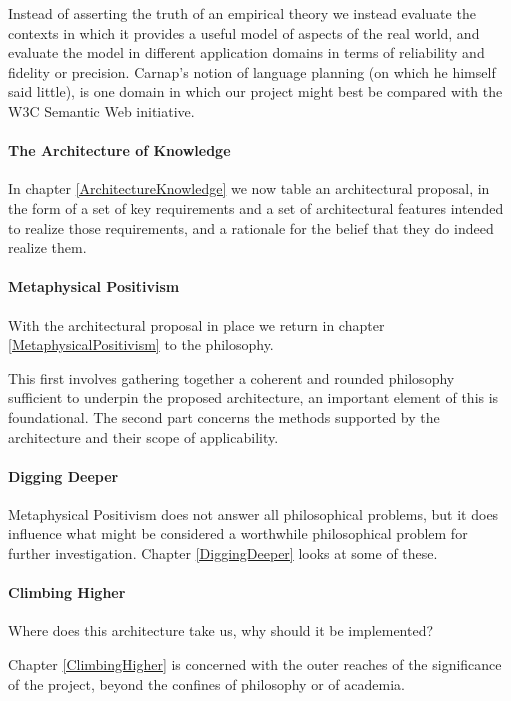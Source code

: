 Instead of asserting the truth of an empirical theory we instead
evaluate the contexts in which it provides a useful model of aspects
of the real world, and evaluate the model in different application
domains in terms of reliability and fidelity or precision.
Carnap's notion of language planning (on which he himself said
little), is one domain in which our project might best be compared
with the W3C Semantic Web initiative.

\paragraph{The Architecture of Knowledge}

In chapter \ref{ArchitectureKnowledge} we now table an architectural
  proposal, in the form of a set of key requirements and a set of
  architectural features intended to realize those requirements, and a
  rationale for the belief that they do indeed realize them.

\paragraph{Metaphysical Positivism}

With the architectural proposal in place we return in chapter
\ref{MetaphysicalPositivism} to the philosophy.

This first involves gathering together a coherent and rounded
philosophy sufficient to underpin the proposed architecture, an
important element of this is foundational.
The second part concerns the methods supported by the architecture and
their scope of applicability.

\paragraph{Digging Deeper}

Metaphysical Positivism does not answer all philosophical problems,
but it does influence what might be considered a worthwhile
philosophical problem for further investigation.
Chapter \ref{DiggingDeeper} looks at some of these.

\paragraph{Climbing Higher}

Where does this architecture take us, why should it be implemented?

Chapter \ref{ClimbingHigher} is concerned with the outer reaches of
  the significance of the project, beyond the confines of philosophy
  or of academia.

